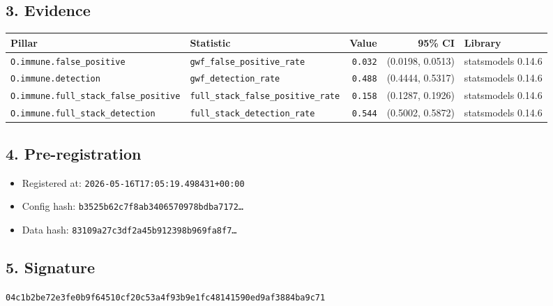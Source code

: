 \documentclass{article}
\begin{document}
\subsection*{3. Evidence}
\begin{tabular}{llrrl}\toprule
\textbf{Pillar} & \textbf{Statistic} & \textbf{Value} & \textbf{95\% CI} & \textbf{Library} \\\midrule
\texttt{O.immune.false\_positive} & \texttt{gwf\_false\_positive\_rate} & \texttt{0.032} & (0.0198, 0.0513) & statsmodels 0.14.6 \\
\texttt{O.immune.detection} & \texttt{gwf\_detection\_rate} & \texttt{0.488} & (0.4444, 0.5317) & statsmodels 0.14.6 \\
\texttt{O.immune.full\_stack\_false\_positive} & \texttt{full\_stack\_false\_positive\_rate} & \texttt{0.158} & (0.1287, 0.1926) & statsmodels 0.14.6 \\
\texttt{O.immune.full\_stack\_detection} & \texttt{full\_stack\_detection\_rate} & \texttt{0.544} & (0.5002, 0.5872) & statsmodels 0.14.6 \\
\bottomrule\end{tabular}
\subsection*{4. Pre-registration}
\begin{itemize}
\item Registered at: \texttt{2026-05-16T17:05:19.498431+00:00}
\item Config hash: \texttt{b3525b62c7f8ab3406570978bdba7172\dots}
\item Data hash: \texttt{83109a27c3df2a45b912398b969fa8f7\dots}
\end{itemize}
\subsection*{5. Signature}
\texttt{04c1b2be72e3fe0b9f64510cf20c53a4f93b9e1fc48141590ed9af3884ba9c71}\\
\end{document}
